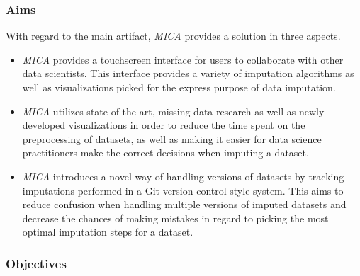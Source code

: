 \documentclass[a4paper, 11pt]{article}
\newcommand{\mica}{\textit{MICA }}
\begin{document}
\subsubsection{Aims}
With regard to the main artifact, \mica provides a solution in three aspects.
\begin{itemize}
        \item \mica provides a touchscreen interface for users to collaborate
                with other data scientists. This interface provides a variety
                of imputation algorithms as well as visualizations picked for
                the express purpose of data imputation.

        \item \mica utilizes state-of-the-art, missing data research as well as
                newly developed visualizations in order to reduce the time
                spent on the preprocessing of datasets, as well as making it
                easier for data science practitioners make the correct
                decisions when imputing a dataset.

        \item \mica introduces a novel way of handling versions of datasets by
                tracking imputations performed in a Git version control style
                system. This aims to reduce confusion when handling multiple
                versions of imputed datasets and decrease the chances of making
                mistakes in regard to picking the most optimal imputation
                steps for a dataset.

\end{itemize}
\subsubsection{Objectives}
\end{document}
